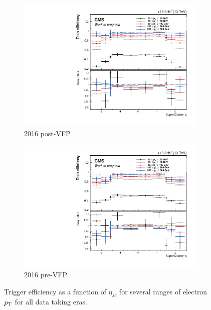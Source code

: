 \begin{figure}[htb!]
\begin{subfigure}[h]{0.45\linewidth}
		\includegraphics[width=\linewidth]{figs/05_analysis/UL2016_postVFP_SFvseta_myWP.pdf}
		\caption{2016 post-VFP}
	\end{subfigure}
	\begin{subfigure}[h]{0.45\linewidth}
		\centering
		\includegraphics[width=\linewidth]{figs/05_analysis/UL2016_preVFP_SFvseta_myWP.pdf}
		\caption{2016 pre-VFP}
	\end{subfigure}
	\caption[Trigger efficiency as a function of $\eta_{sc}$ for several ranges of electron $\pt$ for all data taking eras.]{Trigger efficiency as a function of $\eta_{sc}$ for several ranges of electron $\pt$ for all data taking eras.}
	\label{fig:effVsEta_electronHLT}
\end{figure}

